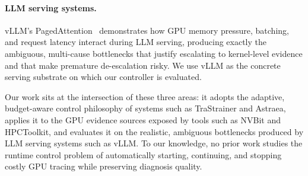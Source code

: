 \paragraph{LLM serving systems.}
vLLM's PagedAttention~\cite{kwon2023vllm} demonstrates how GPU memory pressure, batching, and request latency interact during LLM serving, producing exactly the ambiguous, multi-cause bottlenecks that justify escalating to kernel-level evidence and that make premature de-escalation risky. We use vLLM as the concrete serving substrate on which our controller is evaluated.

Our work sits at the intersection of these three areas: it adopts the adaptive, budget-aware control philosophy of systems such as TraStrainer and Astraea, applies it to the GPU evidence sources exposed by tools such as NVBit and HPCToolkit, and evaluates it on the realistic, ambiguous bottlenecks produced by LLM serving systems such as vLLM. To our knowledge, no prior work studies the runtime control problem of automatically starting, continuing, and stopping costly GPU tracing while preserving diagnosis quality.
